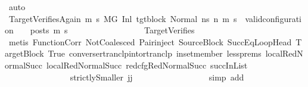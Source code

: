\begin{isabellebody}
\ auto\isanewline
\ \ \ \ \ \ \ \ \ \ \ \ \ \ \isamarkupfalse%
\ TargetVerifiesAgain{\isacharcolon}{\kern0pt}\ {\isachardoublequoteopen}{\isasymforall}m{}{\isacharprime}{\kern0pt}\ s{}{\isacharprime}{\kern0pt}{\isachardot}{\kern0pt}\ {\isacharparenleft}{\kern0pt}M{\isacharcomma}{\kern0pt}{\isasymLambda}{\isacharcomma}{\kern0pt}{\isasymGamma}{\isacharcomma}{\kern0pt}{\isasymOmega}{\isacharcomma}{\kern0pt}G{\isacharprime}{\kern0pt}\ {\isasymturnstile}{\isacharparenleft}{\kern0pt}Inl\ tgt{\isacharunderscore}{\kern0pt}block{\isacharcomma}{\kern0pt}\ Normal\ ns{\isacharprime}{\kern0pt}{\isacharparenright}{\kern0pt}\ {\isacharminus}{\kern0pt}n{\isasymrightarrow}{\isacharasterisk}{\kern0pt}\ {\isacharparenleft}{\kern0pt}m{}{\isacharprime}{\kern0pt}{\isacharcomma}{\kern0pt}\ s{}{\isacharprime}{\kern0pt}{\isacharparenright}{\kern0pt}{\isacharparenright}{\kern0pt}\ {\isasymlongrightarrow}\ valid{\isacharunderscore}{\kern0pt}configuration\ {\isasymLambda}\ {\isasymGamma}\ {\isasymOmega}\ posts\ m{}{\isacharprime}{\kern0pt}\ s{}{\isacharprime}{\kern0pt}{\isachardoublequoteclose}\isanewline
\ \ \ \ \ \ \ \ \ \ \ \ \ \ \ \ \isamarkupfalse%
\ TargetVerifies\isanewline
\ \ \ \ \ \ \ \ \ \ \ \ \ \ \ \ \isamarkupfalse%
\ {\isacharparenleft}{\kern0pt}metis\ FunctionCorr\ NotCoalesced\ Pair{\isacharunderscore}{\kern0pt}inject\ SourceBlock\ SuccEqLoopHead\ TargetBlock\ True\ converse{\isacharunderscore}{\kern0pt}rtranclp{\isacharunderscore}{\kern0pt}into{\isacharunderscore}{\kern0pt}rtranclp\ in{\isacharunderscore}{\kern0pt}set{\isacharunderscore}{\kern0pt}member\ less{\isachardot}{\kern0pt}prems{\isacharparenleft}{\kern0pt}{}{\isacharparenright}{\kern0pt}\ local{\isachardot}{\kern0pt}RedNormalSucc{\isacharparenleft}{\kern0pt}{}{\isacharparenright}{\kern0pt}\ local{\isachardot}{\kern0pt}RedNormalSucc{\isacharparenleft}{\kern0pt}{}{\isacharparenright}{\kern0pt}\ red{\isacharunderscore}{\kern0pt}cfg{\isachardot}{\kern0pt}RedNormalSucc\ succInList{\isacharparenright}{\kern0pt}\isanewline
\ \ \ \ \ \ \ \ \ \ \ \ \ \ \isamarkupfalse%
\ strictlySmaller{\isacharcolon}{\kern0pt}\ {\isachardoublequoteopen}j{\isacharminus}{\kern0pt}{}{\isacharless}{\kern0pt}j{\isachardoublequoteclose}\isanewline
\ \ \ \ \ \ \ \ \ \ \ \ \ \ \ \ \isamarkupfalse%
\ {\isacharparenleft}{\kern0pt}simp\ add{\isacharcolon}{\kern0pt}\ {\isachardoublequoteopen}{}{\isachardoublequoteclose}{\isacharparenleft}{\kern0pt}{}{\isacharparenright}{\kern0pt}{\isacharparenright}{\kern0pt}\isanewline

\end{isabellebody}

